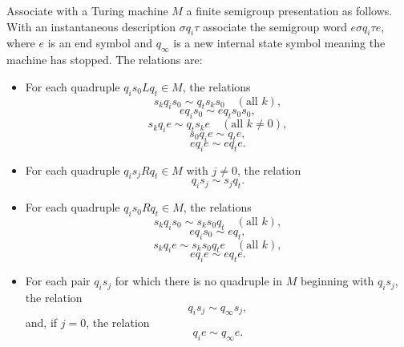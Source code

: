 Associate with a Turing machine $M$ a finite semigroup presentation as follows. With an instantaneous description $\sigma q_i \tau$ associate the semigroup word $e \sigma q_i \tau e$, where $e$ is an end symbol and $q_\infty$ is a new internal state symbol meaning the machine has stopped. The relations are:

\begin{itemize}
\item[(b_0)] For each quadruple $q_i s_0 L q_t \in M$, the relations
$$s_k q_i s_0 \sim q_t s_k s_0 \quad (\text{all } k),$$
$$e q_i s_0 \sim e q_t s_0 s_0,$$
$$s_k q_i e \sim q_t s_k e \quad (\text{all } k \neq 0),$$
$$s_0 q_i e \sim q_t e,$$
$$e q_i e \sim e q_t e.$$

\item[(c)] For each quadruple $q_i s_j R q_t \in M$ with $j \neq 0$, the relation
$$q_i s_j \sim s_j q_t.$$

\item[(c_0)] For each quadruple $q_i s_0 R q_t \in M$, the relations
$$s_k q_i s_0 \sim s_k s_0 q_t \quad (\text{all } k),$$
$$e q_i s_0 \sim e q_t,$$
$$s_k q_i e \sim s_k s_0 q_t e \quad (\text{all } k),$$
$$e q_i e \sim e q_t e.$$

\item[(d)] For each pair $q_i s_j$ for which there is no quadruple in $M$ beginning with $q_i s_j$, the relation
$$q_i s_j \sim q_\infty s_j,$$
and, if $j = 0$, the relation
$$q_i e \sim q_\infty e.$$
\end{itemize}
